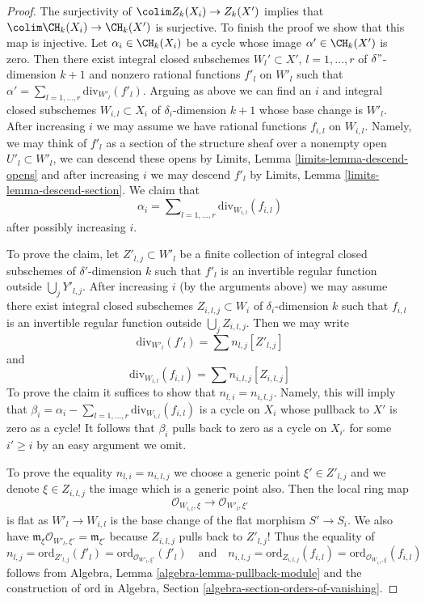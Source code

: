 \begin{proof}
\medskip\noindent
The surjectivity of $\colim Z_k(X_i) \to Z_k(X')$ implies that
$\colim \CH_k(X_i) \to \CH_k(X')$ is surjective.
To finish the proof we show that this map is injective.
Let $\alpha_i \in \CH_k(X_i)$
be a cycle whose image $\alpha' \in \CH_k(X')$ is zero.
Then there exist integral closed subschemes
$W_l' \subset X'$, $l = 1, \ldots, r$ of $\delta"$-dimension $k + 1$
and nonzero rational functions $f'_l$ on $W'_l$
such that $\alpha' = \sum_{l = 1, \ldots, r} \text{div}_{W'_l}(f'_l)$.
Arguing as above we can find an $i$ and integral closed subschemes
$W_{i, l} \subset X_i$ of $\delta_i$-dimension $k + 1$
whose base change is $W'_l$.
After increasing $i$ we may assume we have rational functions
$f_{i, l}$ on $W_{i, l}$. Namely, we may think of $f'_l$ as a
section of the structure sheaf over a nonempty open $U'_l \subset W'_l$,
we can descend these opens by Limits, Lemma \ref{limits-lemma-descend-opens}
and after increasing $i$ we may descend $f'_l$ by
Limits, Lemma \ref{limits-lemma-descend-section}.
We claim that
$$
\alpha_i = \sum\nolimits_{l = 1, \ldots, r} \text{div}_{W_{i, l}}(f_{i, l})
$$
after possibly increasing $i$.

\medskip\noindent
To prove the claim, let $Z'_{l, j} \subset W'_l$ be a finite
collection of integral closed subschemes of $\delta'$-dimension $k$
such that $f'_l$ is an invertible regular function outside
$\bigcup_j Y'_{l, j}$. After increasing $i$ (by the arguments above)
we may assume there exist integral closed subschemes $Z_{i, l, j} \subset W_i$
of $\delta_i$-dimension $k$ such that $f_{i, l}$ is an
invertible regular function outside $\bigcup_j Z_{i, l, j}$.
Then we may write
$$
\text{div}_{W'_l}(f'_l) = \sum n_{l, j} [Z'_{l, j}]
$$
and
$$
\text{div}_{W_{i, l}}(f_{i, l}) = \sum n_{i, l, j} [Z_{i, l, j}]
$$
To prove the claim it suffices to show that $n_{l, i} = n_{i, l, j}$.
Namely, this will imply that $\beta_i =
\alpha_i - \sum\nolimits_{l = 1, \ldots, r} \text{div}_{W_{i, l}}(f_{i, l})$
is a cycle on $X_i$ whose pullback to $X'$ is zero as a cycle!
It follows that $\beta_i$ pulls back to zero as a cycle on $X_{i'}$
for some $i' \geq i$ by an easy argument we omit.

\medskip\noindent
To prove the equality $n_{l, i} = n_{i, l, j}$ we choose a
generic point $\xi' \in Z'_{l, j}$ and we denote
$\xi \in Z_{i, l, j}$ the image which is a generic point also.
Then the local ring map
$$
\mathcal{O}_{W_{i, l}, \xi}
\longrightarrow
\mathcal{O}_{W'_l, \xi'}
$$
is flat as $W'_l \to W_{i, l}$ is the base change of the flat
morphism $S' \to S_i$. We also have
$\mathfrak m_\xi \mathcal{O}_{W'_l, \xi'} = \mathfrak m_{\xi'}$
because $Z_{i, l, j}$ pulls back to $Z'_{l, j}$! Thus the equality of
$$
n_{l, j} = \text{ord}_{Z'_{l, j}}(f'_l) =
\text{ord}_{\mathcal{O}_{W'_l, \xi'}}(f'_l)
\quad\text{and}\quad
n_{i, l, j} = \text{ord}_{Z_{i, l, j}}(f_{i, l}) =
\text{ord}_{\mathcal{O}_{W_{i, l}, \xi}}(f_{i, l})
$$
follows from Algebra, Lemma \ref{algebra-lemma-pullback-module}
and the construction of $\text{ord}$ in
Algebra, Section \ref{algebra-section-orders-of-vanishing}.
\end{proof}

